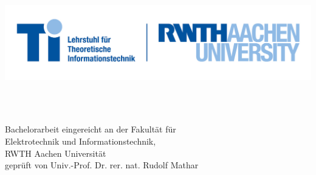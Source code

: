 \thispagestyle{empty}
\begingroup
\vspace*{-30mm}
\begin{flushright}
\includegraphics{figures/rwth_ti_de_rgb.jpg}
\end{flushright}
\centering
\vspace{1.5\drop} %

\begin{center}
{ \titlefont\renewcommand{\baselinestretch}{1.70}\normalsize
{\emphtitleline \textbf{\titlelineA} } \\[0.7\baselineskip]
{\nonemphtitleline \titlelineB} \\
}

\vspace{1.2\drop} %

\makeatletter
{\Large \titlefont{\@author}}\par %
\makeatother

\end{center}

\vspace{2\drop}

\begin{center}
\textsf{Bachelorarbeit eingereicht an der Fakultät für} \\
\textsf{Elektrotechnik und Informationstechnik,}\\
\textsf{RWTH Aachen Universität}\\[0.5\baselineskip]
\textsf{geprüft von Univ.-Prof. Dr. rer. nat. Rudolf Mathar}\\[0.5\baselineskip]
\end{center}

\vfill %
\vspace*{20mm}
{\large {}}\\[0.5\baselineskip] %
{\large {}}\par %

%
%
\endgroup
%
\cleardoublepage
